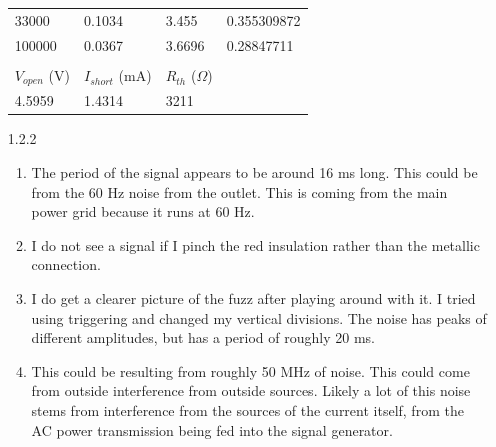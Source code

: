 \documentclass{article}
\begin{document}
\begin{itemize}
\begin{table}[h]
\begin{tabular}{llll}
        33000           & 0.1034            & 3.455           & 0.355309872      \\
        100000          & 0.0367            & 3.6696          & 0.28847711       \\
                        &                   &                 &                  \\
        $V_{open}$ (V) & $I_{short}$ (mA) & $R_{th}$ ($\Omega$)     &                  \\
        4.5959          & 1.4314            & 3211            &                 
        \end{tabular}
        \end{table}
    \item[1.2.2] 
    \begin{enumerate}[label=\alph*]
        \item The period of the signal appears to be around 16 ms long. This could be from the 60 Hz noise from the outlet. This is coming from the main power grid because it runs at 60 Hz.
        \item I do not see a signal if I pinch the red insulation rather than the metallic connection.
        \item I do get a clearer picture of the fuzz after playing around with it. I tried using triggering and changed my vertical divisions. The noise has peaks of different amplitudes, but has a period of roughly 20 ms. 
        \item This could be resulting from roughly 50 MHz of noise. This could come from outside interference from outside sources. Likely a lot of this noise stems from interference from the sources of the current itself, from the AC power transmission being fed into the signal generator.
    \end{enumerate}
    

\end{itemize}
\end{document}
